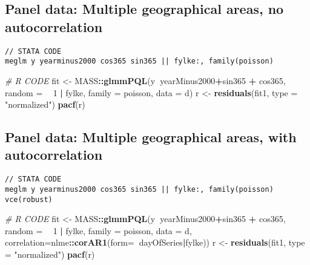 \documentclass[]{book}
\newenvironment{Shaded}{\begin{snugshade}}{\end{snugshade}}
\newcommand{\KeywordTok}[1]{\textcolor[rgb]{0.13,0.29,0.53}{\textbf{#1}}}
\newcommand{\DataTypeTok}[1]{\textcolor[rgb]{0.13,0.29,0.53}{#1}}
\newcommand{\DecValTok}[1]{\textcolor[rgb]{0.00,0.00,0.81}{#1}}
\newcommand{\StringTok}[1]{\textcolor[rgb]{0.31,0.60,0.02}{#1}}
\newcommand{\CommentTok}[1]{\textcolor[rgb]{0.56,0.35,0.01}{\textit{#1}}}
\newcommand{\OperatorTok}[1]{\textcolor[rgb]{0.81,0.36,0.00}{\textbf{#1}}}
\newcommand{\NormalTok}[1]{#1}
\begin{document}
\subsection{Panel data: Multiple geographical areas, no
autocorrelation}\label{panel-data-multiple-geographical-areas-no-autocorrelation}

\begin{verbatim}
// STATA CODE
meglm y yearminus2000 cos365 sin365 || fylke:, family(poisson)
\end{verbatim}

\begin{Shaded}
\begin{Highlighting}[]
\CommentTok{# R CODE}
\NormalTok{fit <-}\StringTok{ }\NormalTok{MASS}\OperatorTok{::}\KeywordTok{glmmPQL}\NormalTok{(y}\OperatorTok{~}\NormalTok{yearMinus2000}\OperatorTok{+}\NormalTok{sin365 }\OperatorTok{+}\StringTok{ }\NormalTok{cos365, }\DataTypeTok{random =} \OperatorTok{~}\StringTok{ }\DecValTok{1} \OperatorTok{|}\StringTok{ }\NormalTok{fylke,}
                \DataTypeTok{family =}\NormalTok{ poisson, }\DataTypeTok{data =}\NormalTok{ d)}
\NormalTok{r <-}\StringTok{ }\KeywordTok{residuals}\NormalTok{(fit1, }\DataTypeTok{type =} \StringTok{"normalized"}\NormalTok{)}
\KeywordTok{pacf}\NormalTok{(r)}
\end{Highlighting}
\end{Shaded}

\subsection{Panel data: Multiple geographical areas, with
autocorrelation}\label{panel-data-multiple-geographical-areas-with-autocorrelation}

\begin{verbatim}
// STATA CODE
meglm y yearminus2000 cos365 sin365 || fylke:, family(poisson) vce(robust)
\end{verbatim}

\begin{Shaded}
\begin{Highlighting}[]
\CommentTok{# R CODE}
\NormalTok{fit <-}\StringTok{ }\NormalTok{MASS}\OperatorTok{::}\KeywordTok{glmmPQL}\NormalTok{(y}\OperatorTok{~}\NormalTok{yearMinus2000}\OperatorTok{+}\NormalTok{sin365 }\OperatorTok{+}\StringTok{ }\NormalTok{cos365, }\DataTypeTok{random =} \OperatorTok{~}\StringTok{ }\DecValTok{1} \OperatorTok{|}\StringTok{ }\NormalTok{fylke,}
                \DataTypeTok{family =}\NormalTok{ poisson, }\DataTypeTok{data =}\NormalTok{ d,}
                \DataTypeTok{correlation=}\NormalTok{nlme}\OperatorTok{::}\KeywordTok{corAR1}\NormalTok{(}\DataTypeTok{form=}\OperatorTok{~}\NormalTok{dayOfSeries}\OperatorTok{|}\NormalTok{fylke))}
\NormalTok{r <-}\StringTok{ }\KeywordTok{residuals}\NormalTok{(fit1, }\DataTypeTok{type =} \StringTok{"normalized"}\NormalTok{)}
\KeywordTok{pacf}\NormalTok{(r)}
\end{Highlighting}
\end{Shaded}
\end{document}

